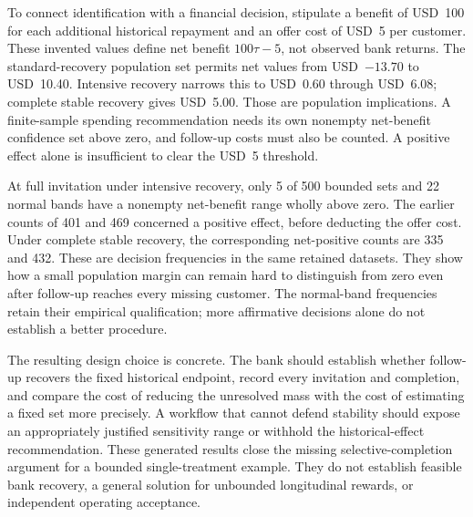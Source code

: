 To connect identification with a financial decision, stipulate a benefit of
USD~100 for each additional historical repayment and an offer cost of USD~5
per customer. These invented values define net benefit $100\tau-5$, not
observed bank returns. The standard-recovery population set permits net
values from USD~$-13.70$ to USD~10.40. Intensive recovery narrows this to
USD~0.60 through USD~6.08; complete stable recovery gives USD~5.00. Those
are population implications. A finite-sample spending recommendation needs
its own nonempty net-benefit confidence set above zero, and follow-up costs
must also be counted. A positive effect alone is insufficient to clear the
USD~5 threshold.

At full invitation under intensive recovery, only 5 of 500 bounded sets
and 22 normal bands have a nonempty net-benefit range wholly above zero.
The earlier counts of 401 and 469 concerned a positive effect, before
deducting the offer cost. Under complete stable recovery, the corresponding
net-positive counts are 335 and 432. These are decision frequencies in the
same retained datasets. They show how a small population margin can remain
hard to distinguish from zero even after follow-up reaches every missing
customer. The normal-band frequencies retain their empirical qualification;
more affirmative decisions alone do not establish a better procedure.

The resulting design choice is concrete. The bank should establish whether
follow-up recovers the fixed historical endpoint, record every invitation and
completion, and compare the cost of reducing the unresolved mass with the
cost of estimating a fixed set more precisely. A workflow that cannot defend
stability should expose an appropriately justified sensitivity range or
withhold the historical-effect recommendation. These generated results close
the missing selective-completion argument for a bounded single-treatment
example. They do not establish feasible bank recovery, a general solution
for unbounded longitudinal rewards, or independent operating acceptance.

